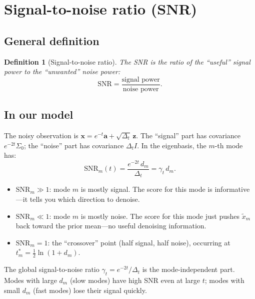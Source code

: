 \documentclass[11pt,a4paper]{article}
\newtheorem{definition}[theorem]{Definition}
\newcommand{\Dt}{\Delta_t}
\begin{document}
\section{Signal-to-noise ratio (SNR)}
\label{sec:q27}

\subsection{General definition}

\begin{definition}[Signal-to-noise ratio]
The SNR is the ratio of the ``useful'' signal power to the ``unwanted'' noise power:
\begin{equation}
  \text{SNR} = \frac{\text{signal power}}{\text{noise power}}.
\end{equation}
\end{definition}

\subsection{In our model}

The noisy observation is $\mathbf{x} = e^{-t}\mathbf{a} + \sqrt{\Dt}\,\mathbf{z}$.  The ``signal'' part has covariance $e^{-2t}\Sigma_0$; the ``noise'' part has covariance $\Dt I$.  In the eigenbasis, the $m$-th mode has:
\begin{equation}
  \text{SNR}_m(t) = \frac{e^{-2t}\,d_m}{\Dt} = \gamma_t\,d_m.
\end{equation}

\begin{itemize}[nosep]
  \item $\text{SNR}_m \gg 1$: mode $m$ is mostly signal.  The score for this mode is informative---it tells you which direction to denoise.
  \item $\text{SNR}_m \ll 1$: mode $m$ is mostly noise.  The score for this mode just pushes $\tilde{x}_m$ back toward the prior mean---no useful denoising information.
  \item $\text{SNR}_m = 1$: the ``crossover'' point (half signal, half noise), occurring at $t_m^* = \frac{1}{2}\ln(1 + d_m)$.
\end{itemize}

The global signal-to-noise ratio $\gamma_t = e^{-2t}/\Dt$ is the mode-independent part.  Modes with large $d_m$ (slow modes) have high SNR even at large $t$; modes with small $d_m$ (fast modes) lose their signal quickly.
\end{document}

